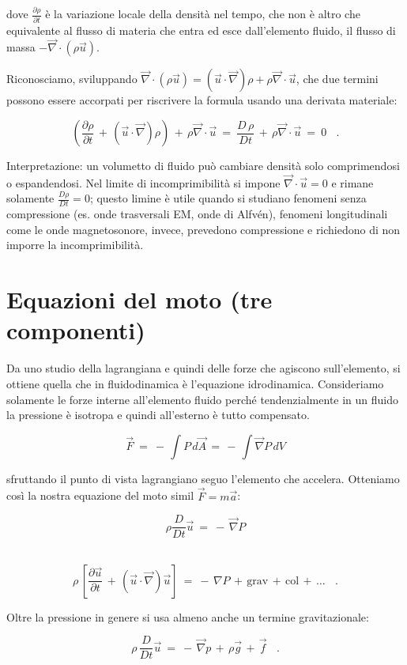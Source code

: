 dove $\displaystyle \frac{\partial \rho}{\partial t}$ è la variazione locale della densità nel tempo, che non è altro che equivalente al flusso di materia che entra ed esce dall'elemento fluido, il flusso di massa $-\vec{\nabla}\cdot(\rho \vec{u})$. 

Riconosciamo, sviluppando $\vec{\nabla} \cdot (\rho \vec u) = (\vec{u}\cdot\vec\nabla)\rho + \rho \vec\nabla\cdot\vec{u}$, che due termini possono essere accorpati per riscrivere la formula usando una derivata materiale:

\[ \left(\frac{\partial \rho}{\partial t}\, +\, (\vec{u}\cdot\vec\nabla)\rho \right)\, +\, \rho \vec\nabla\cdot\vec{u}\ =\ \frac{D\,\rho}{Dt}\, +\, \rho\vec\nabla\cdot\vec{u}\ =\ 0\ \ \ \ . \]

Interpretazione: un volumetto di fluido può cambiare densità solo comprimendosi o espandendosi. 
Nel limite di incomprimibilità si impone $\vec\nabla\cdot\vec{u}=0$ e rimane solamente $\frac{D\rho}{Dt}=0$; questo limine è utile quando si studiano fenomeni senza compressione (es. onde trasversali EM, onde di Alfvén), fenomeni longitudinali come le onde magnetosonore, invece, prevedono compressione e richiedono di non imporre la incomprimibilità.

\section{Equazioni del moto (tre componenti)}
Da uno studio della lagrangiana e quindi delle forze che agiscono sull'elemento, si ottiene quella che in fluidodinamica è l'equazione idrodinamica. Consideriamo solamente le forze interne all'elemento fluido perché tendenzialmente in un fluido la pressione è isotropa e quindi all'esterno è tutto compensato. 

\[\vec F\ =\ -\,\int P\,d\vec A\, =\,-\, \int \vec \nabla P\, dV\] 

sfruttando il punto di vista lagrangiano seguo l'elemento che accelera. Otteniamo così la nostra equazione del moto simil $\vec F = m\vec a$:

\[\rho\frac {D}{Dt}\vec u\ =\ -\,\vec \nabla P\] \

\[ \rho\, \left[ \frac{\partial \vec u}{\partial t}\, +\, (\vec u \cdot \vec \nabla)\vec u \right]\ =\ -\,\nabla P\, +\, \text{grav} \,+\, \text{col}\, +\, \dots  \ \ \ \ .\]

\noindent Oltre la pressione in genere si usa almeno anche un termine gravitazionale:

\begin{equation}\label{fluid-eq-moto}
	\boxed{
		\rho\,\frac{D}{D t} \vec u \ =\ -\,\vec\nabla p\, +\, \rho \vec g \,+ \, \vec f} \ \ \ \ .
\end{equation}

